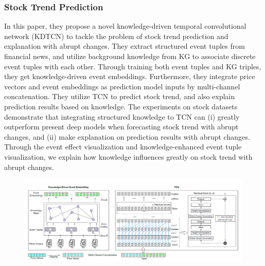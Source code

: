 \subsubsection{Stock Trend Prediction}
In this paper, they propose a novel knowledge-driven temporal convolutional network (KDTCN) to tackle the problem of stock trend prediction and explanation with abrupt changes. They extract structured event tuples from financial news, and utilize background knowledge from KG to associate discrete event tuples with each other. Through training both event tuples and KG triples, they get knowledge-driven event embeddings. Furthermore, they integrate price vectors and event embeddings as prediction model inputs by multi-channel concatenation. They utilize TCN to predict stock trend, and also explain prediction results based on knowledge. The experiments on stock datasets demonstrate that integrating structured knowledge to TCN can (i) greatly outperform present deep models when forecasting stock trend with abrupt changes, and (ii) make explanation on prediction results with abrupt changes. Through the event effect visualization and knowledge-enhanced event tuple visualization, we explain how knowledge influences greatly on stock trend with abrupt changes.

\begin{figure}[H]
    \includegraphics[width=\textwidth]{../Figures/ch_3_11_1.png}
\end{figure}

